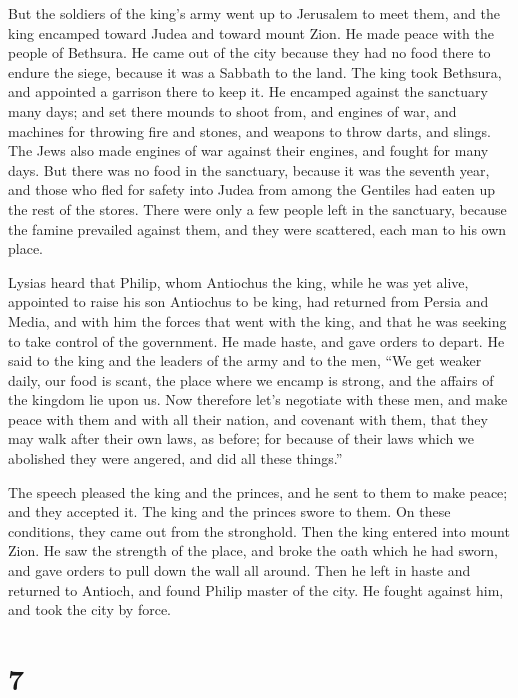  But the soldiers of the king's army went up to Jerusalem
to meet them, and the king encamped toward Judea and toward mount Zion.
 He made peace with the people of Bethsura. He came out
of the city because they had no food there to endure the siege, because
it was a Sabbath to the land.  The king took Bethsura,
and appointed a garrison there to keep it.  He encamped
against the sanctuary many days; and set there mounds to shoot from, and
engines of war, and machines for throwing fire and stones, and weapons
to throw darts, and slings.  The Jews also made engines
of war against their engines, and fought for many days. 
But there was no food in the sanctuary, because it was the seventh year,
and those who fled for safety into Judea from among the Gentiles had
eaten up the rest of the stores.  There were only a few
people left in the sanctuary, because the famine prevailed against them,
and they were scattered, each man to his own place.

 Lysias heard that Philip, whom Antiochus the king, while
he was yet alive, appointed to raise his son Antiochus to be king,
 had returned from Persia and Media, and with him the
forces that went with the king, and that he was seeking to take control
of the government.  He made haste, and gave orders to
depart. He said to the king and the leaders of the army and to the men,
``We get weaker daily, our food is scant, the place where we encamp is
strong, and the affairs of the kingdom lie upon us.  Now
therefore let's negotiate with these men, and make peace with them and
with all their nation,  and covenant with them, that they
may walk after their own laws, as before; for because of their laws
which we abolished they were angered, and did all these things.''

 The speech pleased the king and the princes, and he sent
to them to make peace; and they accepted it.  The king
and the princes swore to them. On these conditions, they came out from
the stronghold.  Then the king entered into mount Zion.
He saw the strength of the place, and broke the oath which he had sworn,
and gave orders to pull down the wall all around.  Then
he left in haste and returned to Antioch, and found Philip master of the
city. He fought against him, and took the city by force.

\hypertarget{section-6}{%
\section{7}\label{section-6}}

